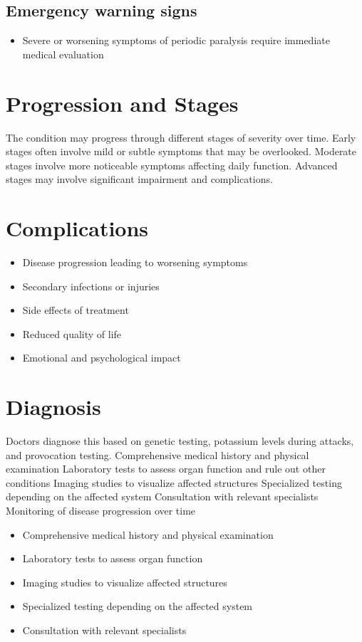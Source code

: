 \subsection{Emergency warning signs}
\begin{itemize}[noitemsep]
  \item Severe or worsening symptoms of periodic paralysis require immediate medical evaluation
\end{itemize}
\section{Progression and Stages}
The condition may progress through different stages of severity over time. Early stages often involve mild or subtle symptoms that may be overlooked. Moderate stages involve more noticeable symptoms affecting daily function. Advanced stages may involve significant impairment and complications.
\section{Complications}
\begin{itemize}[noitemsep]
  \item Disease progression leading to worsening symptoms
  \item Secondary infections or injuries
  \item Side effects of treatment
  \item Reduced quality of life
  \item Emotional and psychological impact
\end{itemize}
\section{Diagnosis}
Doctors diagnose this based on genetic testing, potassium levels during attacks, and provocation testing. Comprehensive medical history and physical examination Laboratory tests to assess organ function and rule out other conditions Imaging studies to visualize affected structures Specialized testing depending on the affected system Consultation with relevant specialists Monitoring of disease progression over time

\begin{itemize}[noitemsep]
  \item Comprehensive medical history and physical examination
  \item Laboratory tests to assess organ function
  \item Imaging studies to visualize affected structures
  \item Specialized testing depending on the affected system
  \item Consultation with relevant specialists
\end{itemize}
